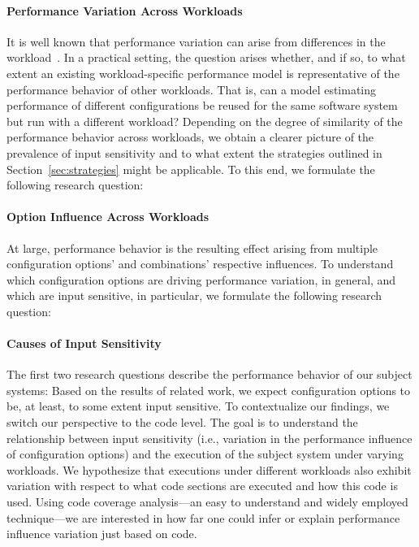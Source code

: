 \paragraph{Performance Variation Across Workloads}
It is well known that performance variation can arise from differences in the workload~\cite{benchmarking_book}. In a practical setting, the question arises whether, and if so, to what extent an existing workload-specific performance model is representative of the performance behavior of other workloads. 
That is, can a model estimating performance of different configurations be reused for the same software system but run with a different workload? Depending on the degree of similarity of the performance behavior across workloads, we obtain a clearer picture of the prevalence of input sensitivity and to what extent the strategies outlined in  Section~\ref{sec:strategies} might be applicable.
To this end, we formulate the following research question: 


\paragraph{Option Influence Across Workloads}
At large, performance behavior is the resulting effect arising from multiple configuration options’ and combinations’ respective influences. To understand which configuration options are driving performance variation, in general, and which are input sensitive, in particular, we formulate the following research question:


\paragraph{Causes of Input Sensitivity}
The first two research questions describe the performance behavior of our subject systems: Based on the results of related work, we expect configuration options to be, at least, to some extent input sensitive. To contextualize our findings, we switch our perspective to the code level. The goal is to understand the relationship between input sensitivity (i.e., variation in the performance influence of configuration options) and the execution of the subject system under varying workloads. We hypothesize that executions under different workloads also exhibit variation with respect to what code sections are executed and how this code is used. Using code coverage analysis---an easy to understand and widely employed technique---we are interested in how far one could infer or explain performance influence variation just based on code. 

